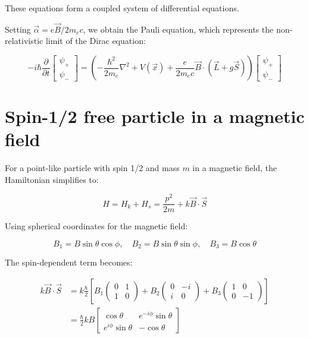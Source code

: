 These equations form a coupled system of differential equations.

Setting $\vec{\alpha}=e \vec{B} / 2 m_{e} c$, we obtain the Pauli equation, which represents the non-relativistic limit of the Dirac equation:

\[
-i \hbar \frac{\partial}{\partial t}\left[\begin{array}{l}
\psi_{+}  \\
\psi_{-}
\end{array}\right]=\left(-\frac{\hbar^{2}}{2 m_{e}} \nabla^{2}+V(\vec{x})+\frac{e}{2 m_{e} c} \vec{B} \cdot(\vec{L}+g \vec{S})\right)\left[\begin{array}{l}
\psi_{+} \\
\psi_{-}
\end{array}\right]
\]

\section{Spin-1/2 free particle in a magnetic field}
For a point-like particle with spin 1/2 and mass $m$ in a magnetic field, the Hamiltonian simplifies to:

\begin{equation}
H=H_{k}+H_{s}=\frac{p^{2}}{2 m}+k \vec{B} \cdot \vec{S}
\end{equation}

Using spherical coordinates for the magnetic field:

\begin{equation}
B_{1}=B \sin \theta \cos \phi, \quad B_{2}=B \sin \theta \sin \phi, \quad B_{3}=B \cos \theta
\end{equation}

The spin-dependent term becomes:

\begin{align}
k \vec{B} \cdot \vec{S} &= k \frac{\hbar}{2}\left[B_{1}\left(\begin{array}{ll}
0 & 1 \\
1 & 0
\end{array}\right)+B_{2}\left(\begin{array}{cc}
0 & -i \\
i & 0
\end{array}\right)+B_{3}\left(\begin{array}{cc}
1 & 0 \\
0 & -1
\end{array}\right)\right] \\
&= \frac{\hbar}{2} k B\left[\begin{array}{cc}
\cos \theta & e^{-i \phi} \sin \theta \\
e^{i \phi} \sin \theta & -\cos \theta
\end{array}\right]
\end{align}

